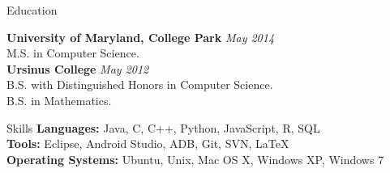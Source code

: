 \documentclass{resume} %
\begin{document}

\begin{rSection}{Education}

{\bf University of Maryland, College Park} \hfill {\em May 2014} \\ 
M.S. in Computer Science.\\

{\bf Ursinus College} \hfill {\em May 2012} \\ 
B.S. with Distinguished Honors in Computer Science.\\
B.S. in Mathematics.
\end{rSection}

\begin{rSection}{Skills}
\textbf{Languages:} Java, C, C++, Python, JavaScript, R, SQL\\
\textbf{Tools:} Eclipse, Android Studio, ADB, Git, SVN, LaTeX\\
\textbf{Operating Systems:} Ubuntu, Unix, Mac OS X, Windows XP, Windows 7
\end{rSection}
\end{document}
